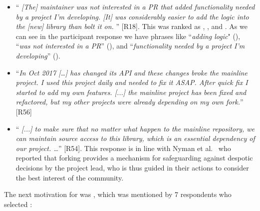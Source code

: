 \begin{itemize}[leftmargin=*]

\item ``\emph{%
[The] maintainer %
was not interested in a PR that added functionality needed by a project I'm developing. [It] was considerably easier to add the logic into the [new] library than bolt it on.%
}'' [R18]. This was ranked as , , and . As we can see in the participant response we have phrases like ``\textit{adding logic}" (), ``\textit{was not interested in a PR}'' (), and ``\textit{functionality needed by a project I'm developing}'' ().

\item ``\emph{In Oct 2017 [\ldots] %
has changed its API and these changes broke the mainline project. I used this project daily and needed to fix it ASAP. After quick fix I started to add my own features. [...] the mainline project has been fixed and refactored, but my other projects were already depending on my own fork.}'' [R56]

\item ``\emph{%
[...] to make sure that no matter what happen to the mainline repository, we can maintain source access to this library, which is an essential dependency of our project. \ldots}'' [R54]. This response is in line with Nyman et al.~\cite{Linus:2012Perspectives} who reported that forking provides a mechanism for safeguarding against despotic decisions by the project lead, who is thus guided in their actions to consider the best interest of the community.

\end{itemize}

\nd The next motivation for   was , which was mentioned by
7 respondents who selected :

